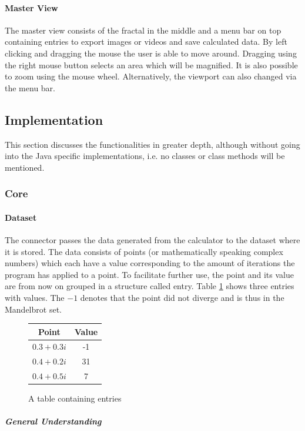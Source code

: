 \documentclass[10pt,a4paper,titlepage]{article}
\begin{document}
	\paragraph{Master View}
	The master view consists of the fractal in the middle and a menu bar on top containing entries to export images or videos and save calculated data. By left clicking and dragging the mouse the user is able to move around. Dragging using the right mouse button selects an area which will be magnified. It is also possible to zoom using the mouse wheel. Alternatively, the viewport can also changed via the menu bar.
	\subsection{Implementation}\label{sec:implementation}
	This section discusses the functionalities in greater depth, although without going into the Java specific implementations, i.e. no classes or class methods will be mentioned.
	\subsubsection{Core}
	\paragraph{Dataset}
	The connector passes the data generated from the calculator to the dataset where it is stored. The data consists of points (or mathematically speaking complex numbers) which each have a value corresponding to the amount of iterations the program has applied to a point. To facilitate further use, the point and its value are from now on grouped in a structure called entry. Table \ref{fig:entries} shows three entries with values. The \(-1\) denotes that the point did not diverge and is thus in the Mandelbrot set.
	\begin{figure}
		\centering
		\caption{A table containing entries}
		\label{fig:entries}
		\begin{tabular}{c|c}
			Point        & Value \\ \hline
			\(0.3+0.3i\) & -1    \\ \hline
			\(0.4+0.2i\) & 31    \\ \hline
			\(0.4+0.5i\) & 7     \\
		\end{tabular}
	\end{figure}
	\subparagraph{General Understanding}
	
%		
\end{document}
